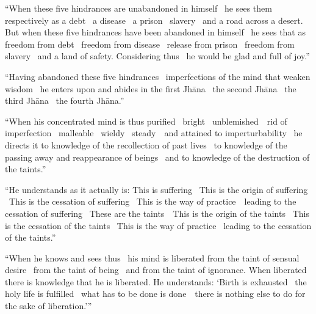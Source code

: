 \suttaRef{[MN 107]}

\begin{english-only-justify}
  ``When these five hindrances are unabandoned in himself \breathmark\ he sees them respectively as a debt \breathmark\ a disease \breathmark\ a prison \breathmark\ slavery \breathmark\ and a road across a desert. But when these five hindrances have been abandoned in himself \breathmark\ he sees that as freedom from debt \breathmark\ freedom from disease \breathmark\ release from prison \breathmark\ freedom from slavery \breathmark\ and a land of safety. Considering thus \breathmark\ he would be glad and full of joy.''
\end{english-only-justify}

\begin{english-only-justify}
  ``Having abandoned these five hindrances \breathmark\ imperfections of the mind that weaken wisdom \breathmark\ he enters upon and abides in the first Jhāna \breathmark\ the second Jhāna \breathmark\ the third Jhāna \breathmark\ the fourth Jhāna.''
\end{english-only-justify}

\begin{english-only-justify}
  ``When his concentrated mind is thus purified \breathmark\ bright \breathmark\ \mbox{unblemished}~\breathmark\ rid of imperfection \breathmark\ malleable \breathmark\ wieldy \breathmark\ \mbox{steady}~\breathmark\ and attained to imperturbability \breathmark\ he directs it to knowledge of the recollection of past lives \breathmark\ to knowledge of the passing away and reappearance of beings \breathmark\ and to knowledge of the destruction of the taints.''
\end{english-only-justify}

\begin{english-only-justify}
  ``He understands as it actually is: This is suffering \breathmark\ This is the origin of suffering \breathmark\ This is the cessation of suffering \breathmark\ This is the way of \mbox{practice}~\breathmark\ leading to the cessation of suffering \breathmark\ These are the \mbox{taints}~\breathmark\ This is the origin of the taints \breathmark\ This is the cessation of the taints \breathmark\ This is the way of practice \breathmark\ leading to the cessation of the taints.''
\end{english-only-justify}

\begin{english-only-justify}
  ``When he knows and sees thus \breathmark\ his mind is liberated from the taint of sensual desire \breathmark\ from the taint of being \breathmark\ and from the taint of ignorance. When liberated there is knowledge that he is liberated. He understands: `Birth is exhausted \breathmark\ the holy life is fulfilled \breathmark\ what has to be done is \mbox{done}~\breathmark\ there is nothing else to do for the sake of liberation.'''
\end{english-only-justify}

